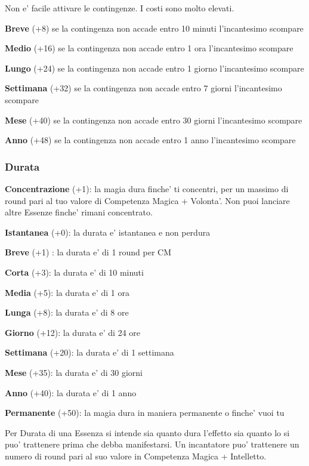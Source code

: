 \documentclass[a4paper,11pt,twoside,openany]{book}
\begin{document}
	Non e' facile attivare le contingenze. I costi sono molto elevati.
	
	\textbf{Breve} (+8) se la contingenza non accade entro 10 minuti l'incantesimo scompare
	
	\textbf{Medio} (+16) se la contingenza non accade entro 1 ora l'incantesimo scompare
	
	\textbf{Lungo} (+24) se la contingenza non accade entro 1 giorno l'incantesimo scompare
	
	\textbf{Settimana} (+32) se la contingenza non accade entro 7 giorni l'incantesimo scompare
	
	\textbf{Mese} (+40) se la contingenza non accade entro 30 giorni l'incantesimo scompare
	
	\textbf{Anno} (+48) se la contingenza non accade entro 1 anno l'incantesimo scompare
	
	\subsubsection{Durata}
	
	\label{durata}
	
	\textbf{Concentrazione} (+1): la magia dura finche' ti concentri, per un massimo di round pari al tuo valore di Competenza Magica + Volonta'. Non puoi lanciare altre Essenze finche' rimani concentrato.
	
	\textbf{Istantanea} (+0): la durata e' istantanea e non perdura
	
	\textbf{Breve} (+1) : la durata e' di 1 round per CM
	
	\textbf{Corta} (+3): la durata e' di 10 minuti
	
	\textbf{Media} (+5): la durata e' di 1 ora
	
	\textbf{Lunga} (+8): la durata e' di 8 ore
	
	\textbf{Giorno} (+12): la durata e' di 24 ore
	
	\textbf{Settimana} (+20): la durata e' di 1 settimana
	
	\textbf{Mese} (+35): la durata e' di 30 giorni
	
	\textbf{Anno} (+40): la durata e' di 1 anno
	
	\textbf{Permanente} (+50): la magia dura in maniera permanente o finche' vuoi tu
	
	Per Durata di una Essenza si intende sia quanto dura l'effetto sia quanto lo si puo' trattenere prima che debba manifestarsi. Un incantatore puo' trattenere un numero di round pari al suo valore in Competenza Magica + Intelletto.
	
\end{document}
